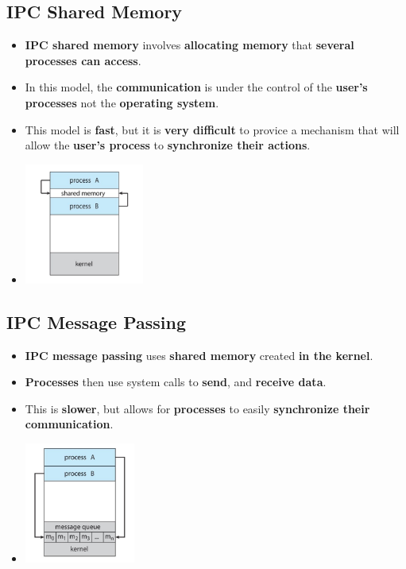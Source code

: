 \documentclass{article}
\begin{document}
    \subsection*{IPC Shared Memory}
    \begin{itemize}
        \item \textbf{IPC shared memory} involves \textbf{allocating memory} that \textbf{several processes can access}.
        \item In this model, the \textbf{communication} is under the control of the \textbf{user's processes} not the \textbf{operating system}.
        \item This model is \textbf{fast}, but it is \textbf{very difficult} to provice a mechanism that will allow the \textbf{user's process} to \textbf{synchronize their actions}.
        \item[] \begin{center}
                    \includegraphics*[height=150px]{images/Shared-Memory.PNG}
                \end{center} 
    \end{itemize}

    \subsection*{IPC Message Passing}
    \begin{itemize}
        \item \textbf{IPC message passing} uses \textbf{shared memory} created \textbf{in the kernel}.
        \item \textbf{Processes} then use system calls to \textbf{send}, and \textbf{receive data}.
        \item This is \textbf{slower}, but allows for \textbf{processes} to easily \textbf{synchronize their communication}.
        \item[] \begin{center}
            \includegraphics*[height=150px]{images/Message-Passing.PNG}
        \end{center} 
    \end{itemize}
\end{document}
